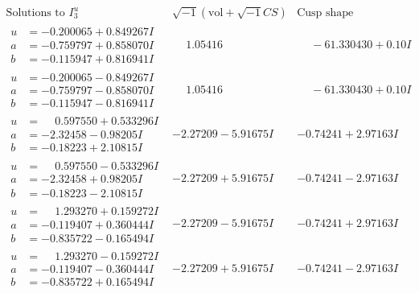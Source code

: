\documentclass[1p]{elsarticle_modified}
\theoremstyle{definition}
\newcommand{\I}{\sqrt{-1}}
\begin{document}
$$\begin{array}{c|c|c}  
\text{Solutions to }I^u_{3}& \I (\text{vol} + \sqrt{-1}CS) & \text{Cusp shape}\\
 \hline 
\begin{aligned}
u &= -0.200065 + 0.849267 I \\
a &= -0.759797 + 0.858070 I \\
b &= -0.115947 + 0.816941 I\end{aligned}
 & \phantom{-}1.05416\phantom{ +0.000000I} & \phantom{-}                -6
1.330430 + 0. 10   I\phantom{ +0.000000I} \\ \hline\begin{aligned}
u &= -0.200065 - 0.849267 I \\
a &= -0.759797 - 0.858070 I \\
b &= -0.115947 - 0.816941 I\end{aligned}
 & \phantom{-}1.05416\phantom{ +0.000000I} & \phantom{-}                -6
1.330430 + 0. 10   I\phantom{ +0.000000I} \\ \hline\begin{aligned}
u &= \phantom{-}0.597550 + 0.533296 I \\
a &= -2.32458 - 0.98205 I \\
b &= -0.18223 + 2.10815 I\end{aligned}
 & -2.27209 - 5.91675 I & -0.74241 + 2.97163 I \\ \hline\begin{aligned}
u &= \phantom{-}0.597550 - 0.533296 I \\
a &= -2.32458 + 0.98205 I \\
b &= -0.18223 - 2.10815 I\end{aligned}
 & -2.27209 + 5.91675 I & -0.74241 - 2.97163 I \\ \hline\begin{aligned}
u &= \phantom{-}1.293270 + 0.159272 I \\
a &= -0.119407 + 0.360444 I \\
b &= -0.835722 - 0.165494 I\end{aligned}
 & -2.27209 - 5.91675 I & -0.74241 + 2.97163 I \\ \hline\begin{aligned}
u &= \phantom{-}1.293270 - 0.159272 I \\
a &= -0.119407 - 0.360444 I \\
b &= -0.835722 + 0.165494 I\end{aligned}
 & -2.27209 + 5.91675 I & -0.74241 - 2.97163 I \\ \hline\begin{aligned}

\end{aligned}
\end{array}$$
\end{document}
